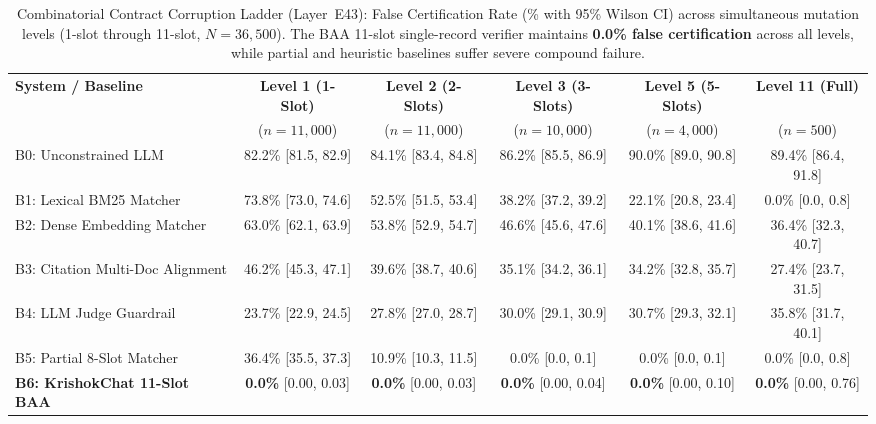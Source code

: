 \begin{table}[t]
\centering\small
\caption{Combinatorial Contract Corruption Ladder (Layer~E43): False Certification Rate (\% with 95\% Wilson CI) across simultaneous mutation levels (1-slot through 11-slot, $N=36{,}500$). The BAA 11-slot single-record verifier maintains \textbf{0.0\% false certification} across all levels, while partial and heuristic baselines suffer severe compound failure.}
\label{tab:combinatorial_contract_corruption}
\begin{tabular}{lccccc}
\toprule
\textbf{System / Baseline} & \textbf{Level 1 (1-Slot)} & \textbf{Level 2 (2-Slots)} & \textbf{Level 3 (3-Slots)} & \textbf{Level 5 (5-Slots)} & \textbf{Level 11 (Full)} \\
 & ($n=11{,}000$) & ($n=11{,}000$) & ($n=10{,}000$) & ($n=4{,}000$) & ($n=500$) \\
\midrule
B0: Unconstrained LLM & 82.2\% [81.5, 82.9] & 84.1\% [83.4, 84.8] & 86.2\% [85.5, 86.9] & 90.0\% [89.0, 90.8] & 89.4\% [86.4, 91.8] \\
B1: Lexical BM25 Matcher & 73.8\% [73.0, 74.6] & 52.5\% [51.5, 53.4] & 38.2\% [37.2, 39.2] & 22.1\% [20.8, 23.4] & 0.0\% [0.0, 0.8] \\
B2: Dense Embedding Matcher & 63.0\% [62.1, 63.9] & 53.8\% [52.9, 54.7] & 46.6\% [45.6, 47.6] & 40.1\% [38.6, 41.6] & 36.4\% [32.3, 40.7] \\
B3: Citation Multi-Doc Alignment & 46.2\% [45.3, 47.1] & 39.6\% [38.7, 40.6] & 35.1\% [34.2, 36.1] & 34.2\% [32.8, 35.7] & 27.4\% [23.7, 31.5] \\
B4: LLM Judge Guardrail & 23.7\% [22.9, 24.5] & 27.8\% [27.0, 28.7] & 30.0\% [29.1, 30.9] & 30.7\% [29.3, 32.1] & 35.8\% [31.7, 40.1] \\
B5: Partial 8-Slot Matcher & 36.4\% [35.5, 37.3] & 10.9\% [10.3, 11.5] & 0.0\% [0.0, 0.1] & 0.0\% [0.0, 0.1] & 0.0\% [0.0, 0.8] \\
\textbf{B6: KrishokChat 11-Slot BAA} & \textbf{0.0\%} [0.00, 0.03] & \textbf{0.0\%} [0.00, 0.03] & \textbf{0.0\%} [0.00, 0.04] & \textbf{0.0\%} [0.00, 0.10] & \textbf{0.0\%} [0.00, 0.76] \\
\bottomrule
\end{tabular}
\end{table}

